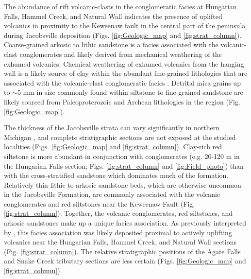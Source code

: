 \documentclass[draft]{agujournal2019}
\begin{document}
The abundance of rift volcanic-clasts in the conglomeratic facies at Hungarian Falls, Hammel Creek, and Natural Wall indicates the presence of uplifted volcanics in proximity to the Keweenaw fault in the central part of the peninsula during Jacobsville deposition (Figs. \ref{fig:Geologic_map} and \ref{fig:strat_column}). Coarse-grained arkosic to lithic sandstone is a facies associated with the volcanic-clast conglomerates and likely derived from mechanical weathering of the exhumed volcanics. Chemical weathering of exhumed volcanics from the hanging wall is a likely source of clay within the abundant fine-grained lithologies that are associated with the volcanic-clast conglomeratic facies \cite{Hamblin1958a}. Detrital mica grains up to $\sim$5 mm in size commonly found within siltstone to fine-grained sandstone are likely sourced from Paleoproterozoic and Archean lithologies in the region (Fig. \ref{fig:Geologic_map}).

The thickness of the Jacobsville strata can vary significantly in northern Michigan \cite{Hamblin1958a, Kalliokoski1982a}, and complete stratigraphic sections are not exposed at the studied localities (Figs. \ref{fig:Geologic_map} and \ref{fig:strat_column}). Clay-rich red siltstone is more abundant in conjunction with conglomerates (e.g. 20-120 m in the Hungarian Falls section; Figs. \ref{fig:strat_column} and \ref{fig:Field_photo}) than with the cross-stratified sandstone which dominates much of the formation. Relatively thin lithic to arkosic sandstone beds, which are otherwise uncommon in the Jacobsville Formation, are commonly associated with the volcanic conglomerates and red siltstones near the Keweenaw Fault (Fig. \ref{fig:strat_column}). Together, the volcanic conglomerates, red siltstones, and arkosic sandstones make up a unique facies association. As previously interpreted by , this facies association was likely deposited proximal to actively uplifting volcanics near the Hungarian Falls, Hammel Creek, and Natural Wall sections (Fig. \ref{fig:strat_column}). The relative stratigraphic positions of the Agate Falls and Snake Creek tributary sections are less certain (Figs. \ref{fig:Geologic_map} and \ref{fig:strat_column}).
\end{document}
